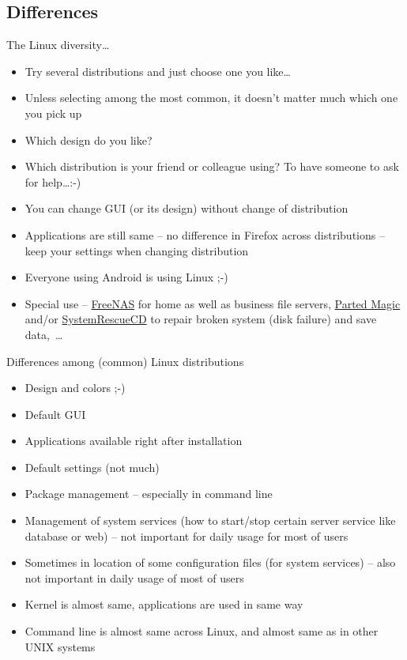 \documentclass[compress, ucs, xelatex, 11pt, xcolor=svgnames,
  hyperref={
    bookmarks=true,
    unicode=true,
    colorlinks=true,
    pdftitle={Linux, command line and MetaCentrum},
    plainpages=false,
    pdfauthor={Vojtech Zeisek},
    pdfsubject={Course about use of Linux command line, writing shell scripts and using MetaCentrum of CESNET},
    pdfcreator={XeLaTeX},
    pdfkeywords={Linux, GNU, BASH, shell, command line, MetaCentrum},
    linkcolor=Red,
    anchorcolor=Blue,
    citecolor=Purple,
    filecolor=DodgerBlue,
    menucolor=DarkOrchid,
    urlcolor=DeepSkyBlue,
    pdftex},
  url={hyphens, lowtilde} %
  ]{beamer}
\begin{document}
\subsection{Differences}

\begin{frame}{The Linux diversity\ldots}
\begin{itemize}
  \item Try several distributions and just choose one you like\ldots
  \item Unless selecting among the most common, it doesn't matter much which one you pick up
  \item Which design do you like?
  \item Which distribution is your friend or colleague using? To have someone to ask for help\ldots :-)
  \item You can change GUI (or its design) without change of distribution
  \item Applications are still same -- no difference in Firefox across distributions -- keep your settings when changing distribution
  \item Everyone using Android is using Linux ;-)
  \item Special use -- \href{http://www.freenas.org/}{FreeNAS} for home as well as business file servers, \href{https://partedmagic.com/}{Parted Magic} and/or \href{https://www.system-rescue-cd.org/SystemRescueCd_Homepage}{SystemRescueCD} to repair broken system (disk failure) and save data,~\ldots
\end{itemize}
\end{frame}

\begin{frame}{Differences among (common) Linux distributions}
\begin{itemize}
  \item Design and colors ;-)
  \item Default GUI
  \item Applications available right after installation
  \item Default settings (not much)
  \item Package management -- especially in command line
  \item Management of system services (how to start/stop certain server service like database or web) -- not important for daily usage for most of users
  \item Sometimes in location of some configuration files (for system services) -- also not important in daily usage of most of users
  \item Kernel is almost same, applications are used in same way
  \item Command line is almost same across Linux, and almost same as in other UNIX systems
\end{itemize}
\end{frame}
\end{document}
